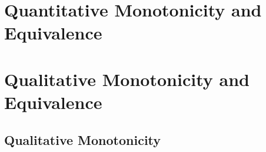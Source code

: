     \label{chap:reason}

\section{Quantitative Monotonicity and Equivalence}


\section{Qualitative Monotonicity and Equivalence}
\subsection{Qualitative Monotonicity}
    \label{sec:monotone}


